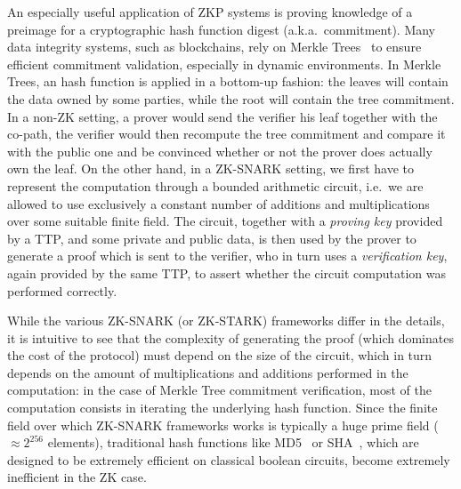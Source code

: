 An especially useful application of ZKP systems is proving knowledge of a preimage 
for a cryptographic hash function digest (a.k.a.\ commitment).
Many data integrity systems, such as blockchains, rely on Merkle Trees~\cite{Merkle1979} to 
ensure efficient commitment validation, especially in dynamic environments. 
In Merkle Trees, an hash function is applied in a bottom-up fashion: the leaves will contain the 
data owned by some parties, while the root will contain the tree commitment.
In a non-ZK setting, a prover would send the verifier his leaf together with the co-path, 
the verifier would then recompute the tree commitment and compare it with the public one and be 
convinced whether or not the prover does actually own the leaf. 
On the other hand, in a ZK-SNARK setting, we first have to represent the computation through a 
bounded arithmetic circuit, i.e.\ we are allowed to use exclusively a constant number of additions 
and multiplications over some suitable finite field.
The circuit, together with a \emph{proving key} provided by a TTP, and some private and public data, 
is then used by the prover to generate a proof which is sent to the verifier, who in turn uses a 
\emph{verification key}, again provided by the same TTP, to assert whether the circuit computation
was performed correctly. 

While the various ZK-SNARK (or ZK-STARK) frameworks differ in the details, it is intuitive to see
that the complexity of generating the proof (which dominates the cost of the protocol) must depend 
on the size of the circuit, which in turn depends on the amount of multiplications and additions 
performed in the computation: in the case of Merkle Tree commitment verification, most of the 
computation consists in iterating the underlying hash function. 
Since the finite field over which ZK-SNARK frameworks works is typically a huge prime field 
(\(\approx 2^{256}\) elements), traditional hash functions like MD5~\cite{Rivest1990} or 
SHA~\cite{Dang2015}, which are designed to be extremely efficient on classical boolean circuits, 
become extremely inefficient in the ZK case.

